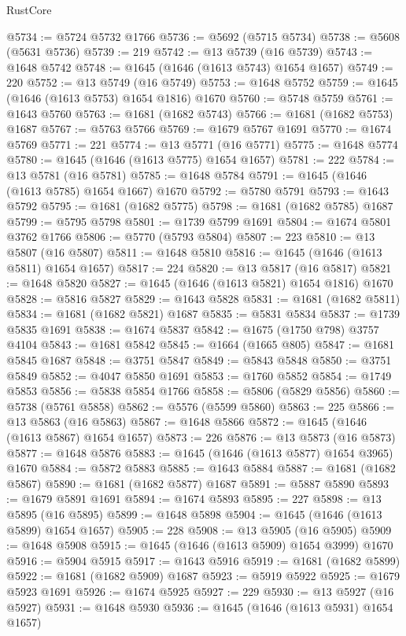 \begin{lexlean}{RustCore}
\begin{coremodule}
@5734 := @5724 @5732 @1766
@5736 := @5692 (@5715 @5734)
@5738 := @5608 (@5631 @5736)
@5739 := 219
@5742 := @13 @5739 (@16 @5739)
@5743 := @1648 @5742
@5748 := @1645 (@1646 (@1613 @5743) @1654 @1657)
@5749 := 220
@5752 := @13 @5749 (@16 @5749)
@5753 := @1648 @5752
@5759 := @1645 (@1646 (@1613 @5753) @1654 @1816) @1670
@5760 := @5748 @5759
@5761 := @1643 @5760
@5763 := @1681 (@1682 @5743)
@5766 := @1681 (@1682 @5753) @1687
@5767 := @5763 @5766
@5769 := @1679 @5767 @1691
@5770 := @1674 @5769
@5771 := 221
@5774 := @13 @5771 (@16 @5771)
@5775 := @1648 @5774
@5780 := @1645 (@1646 (@1613 @5775) @1654 @1657)
@5781 := 222
@5784 := @13 @5781 (@16 @5781)
@5785 := @1648 @5784
@5791 := @1645 (@1646 (@1613 @5785) @1654 @1667) @1670
@5792 := @5780 @5791
@5793 := @1643 @5792
@5795 := @1681 (@1682 @5775)
@5798 := @1681 (@1682 @5785) @1687
@5799 := @5795 @5798
@5801 := @1739 @5799 @1691
@5804 := @1674 @5801 @3762 @1766
@5806 := @5770 (@5793 @5804)
@5807 := 223
@5810 := @13 @5807 (@16 @5807)
@5811 := @1648 @5810
@5816 := @1645 (@1646 (@1613 @5811) @1654 @1657)
@5817 := 224
@5820 := @13 @5817 (@16 @5817)
@5821 := @1648 @5820
@5827 := @1645 (@1646 (@1613 @5821) @1654 @1816) @1670
@5828 := @5816 @5827
@5829 := @1643 @5828
@5831 := @1681 (@1682 @5811)
@5834 := @1681 (@1682 @5821) @1687
@5835 := @5831 @5834
@5837 := @1739 @5835 @1691
@5838 := @1674 @5837
@5842 := @1675 (@1750 @798) @3757 @4104
@5843 := @1681 @5842
@5845 := @1664 (@1665 @805)
@5847 := @1681 @5845 @1687
@5848 := @3751 @5847
@5849 := @5843 @5848
@5850 := @3751 @5849
@5852 := @4047 @5850 @1691
@5853 := @1760 @5852
@5854 := @1749 @5853
@5856 := @5838 @5854 @1766
@5858 := @5806 (@5829 @5856)
@5860 := @5738 (@5761 @5858)
@5862 := @5576 (@5599 @5860)
@5863 := 225
@5866 := @13 @5863 (@16 @5863)
@5867 := @1648 @5866
@5872 := @1645 (@1646 (@1613 @5867) @1654 @1657)
@5873 := 226
@5876 := @13 @5873 (@16 @5873)
@5877 := @1648 @5876
@5883 := @1645 (@1646 (@1613 @5877) @1654 @3965) @1670
@5884 := @5872 @5883
@5885 := @1643 @5884
@5887 := @1681 (@1682 @5867)
@5890 := @1681 (@1682 @5877) @1687
@5891 := @5887 @5890
@5893 := @1679 @5891 @1691
@5894 := @1674 @5893
@5895 := 227
@5898 := @13 @5895 (@16 @5895)
@5899 := @1648 @5898
@5904 := @1645 (@1646 (@1613 @5899) @1654 @1657)
@5905 := 228
@5908 := @13 @5905 (@16 @5905)
@5909 := @1648 @5908
@5915 := @1645 (@1646 (@1613 @5909) @1654 @3999) @1670
@5916 := @5904 @5915
@5917 := @1643 @5916
@5919 := @1681 (@1682 @5899)
@5922 := @1681 (@1682 @5909) @1687
@5923 := @5919 @5922
@5925 := @1679 @5923 @1691
@5926 := @1674 @5925
@5927 := 229
@5930 := @13 @5927 (@16 @5927)
@5931 := @1648 @5930
@5936 := @1645 (@1646 (@1613 @5931) @1654 @1657)

\end{coremodule}
\end{lexlean}
